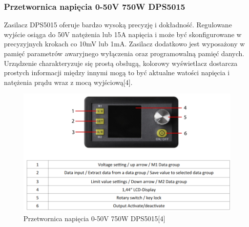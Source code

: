 \documentclass[oneside]{mgr}
\begin{document}
\subsubsection{Przetwornica napięcia 0-50V 750W DPS5015}

Zasilacz DPS5015 oferuje bardzo wysoką precyzję i dokładność. Regulowane wyjście osiąga do 50V natężenia lub 15A napięcia i może być skonfigurowane w precyzyjnych krokach co 10mV lub 1mA. Zasilacz dodatkowo jest wyposażony w pamięć parametrów awaryjnego wyłączenia oraz programowalną pamięć danych. Urządzenie charakteryzuje się prostą obsługą, kolorowy wyświetlacz dostarcza prostych informacji między innymi mogą to być aktualne watości napięcia i natężenia prądu wraz z mocą wyjściową[4].

\begin{figure}[h!]
    \centering
    \includegraphics[width=\textwidth]{Przetwornica_napiecia.PNG}
    \caption{Przetwornica napięcia 0-50V 750W DPS5015[4]}
\end{figure}
\end{document}
